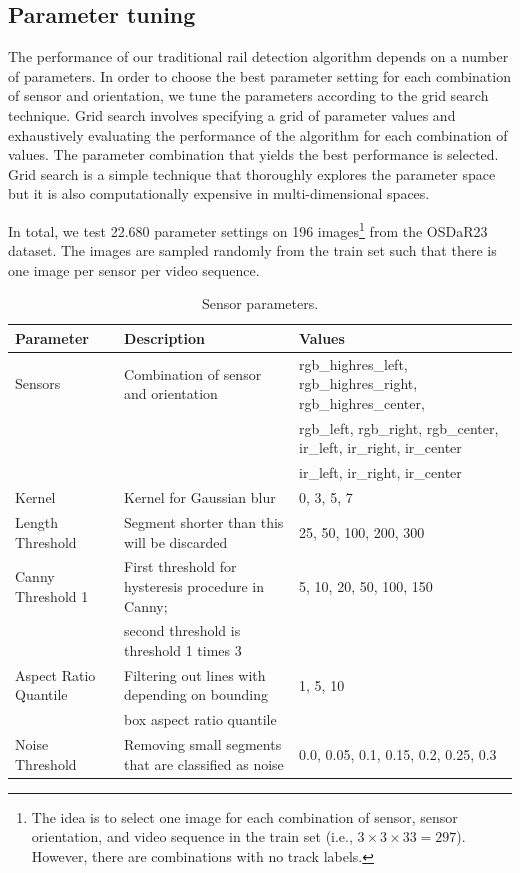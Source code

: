 \documentclass[Master,MDS,english]{BASE/twbook} %
\begin{document}
\subsection{Parameter tuning} \label{sec:fld_parameter}

The performance of our traditional rail detection algorithm depends on a number of parameters. In order to choose the best parameter setting for each combination of sensor and orientation, we tune the parameters according to the grid search technique. Grid search involves specifying a grid of parameter values and exhaustively evaluating the performance of the algorithm for each combination of values. The parameter combination that yields the best performance is selected. Grid search is a simple technique that thoroughly   explores the parameter space but it is also computationally expensive in multi-dimensional spaces.

In total, we test 22.680 parameter settings on 196 images\footnote{The idea is to select one image for each combination of sensor, sensor orientation, and video sequence in the train set (i.e., $3\times3\times33 = 297$). However, there are combinations with no track labels.} from the OSDaR23 dataset. The images are sampled randomly from the train set such that there is one image per sensor per video sequence. 
 
\begin{table}[htbp]
    \centering
    \tiny
    \begin{tabular}{|l|l|l|}
        \hline
        \textbf{Parameter} & \textbf{Description} & \textbf{Values} \\
        \hline
        Sensors & Combination of sensor and orientation & rgb\_highres\_left, rgb\_highres\_right, rgb\_highres\_center,  \\
                & & rgb\_left, rgb\_right, rgb\_center, ir\_left, ir\_right, ir\_center \\
                 & &  ir\_left, ir\_right, ir\_center \\
        \hline
        Kernel & Kernel for Gaussian blur & 0, 3, 5, 7 \\
        \hline
        Length Threshold & Segment shorter than this will be discarded & 25, 50, 100, 200, 300 \\
        \hline
        Canny Threshold 1 & First threshold for hysteresis procedure in Canny;  & 5, 10, 20, 50, 100, 150 \\
         & second threshold is threshold 1 times 3 &  \\
        \hline
        Aspect Ratio Quantile & Filtering out lines with depending on bounding  & 1, 5, 10 \\
          &  box aspect ratio quantile &  \\
        \hline
        Noise Threshold & Removing small segments that are classified as noise & 0.0, 0.05, 0.1, 0.15, 0.2, 0.25, 0.3 \\
        \hline
    \end{tabular}
    \caption{Sensor parameters.}  \label{tab:sensor_parameters_fld}
\end{table}
\end{document}
